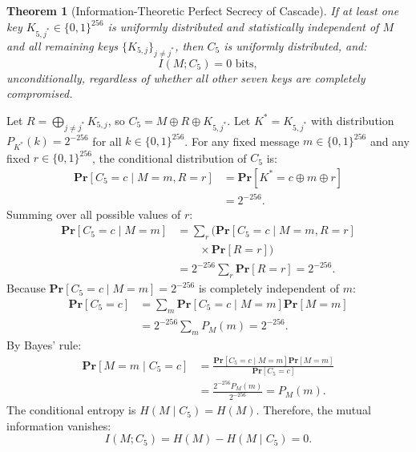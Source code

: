 \documentclass{ieeeaccess}
\renewcommand{\Pr}{\mathbf{Pr}}
\newtheorem{theorem}{Theorem}
\newenvironment{proof}{\begin{IEEEproof}\IEEEQEDoff}{\end{IEEEproof}}
\begin{document}
\begin{theorem}[Information-Theoretic Perfect Secrecy of Cascade]
\label{thm:L5-perfect}
If at least one key $K_{5,j^*} \in \{0,1\}^{256}$ is uniformly distributed and statistically independent of $M$ and all remaining keys $\{K_{5,j}\}_{j \neq j^*}$, then $C_5$ is uniformly distributed, and:
\begin{equation}
  I(M; C_5) = 0 \text{ bits},
\end{equation}
unconditionally, regardless of whether all other seven keys are completely compromised.
\end{theorem}
\begin{proof}
Let $R = \bigoplus_{j \neq j^*} K_{5,j}$, so $C_5 = M \oplus R \oplus K_{5,j^*}$.
Let $K^* = K_{5,j^*}$ with distribution $P_{K^*}(k) = 2^{-256}$ for all $k \in \{0,1\}^{256}$.
For any fixed message $m \in \{0,1\}^{256}$ and any fixed $r \in \{0,1\}^{256}$, the conditional distribution of $C_5$ is:
\begin{equation}
\begin{aligned}
  \Pr[C_5 = c \mid M=m, R=r] &= \Pr[K^* = c \oplus m \oplus r] \\
  &= 2^{-256}.
\end{aligned}
\end{equation}
Summing over all possible values of $r$:
\begin{equation}
\begin{aligned}
  \Pr[C_5 = c \mid M=m]
  &= \sum_r \Big( \Pr[C_5=c \mid M=m, R=r] \\
  &\quad\quad \times \Pr[R=r] \Big) \\
  &= 2^{-256} \sum_r \Pr[R=r] = 2^{-256}.
\end{aligned}
\end{equation}
Because $\Pr[C_5 = c \mid M = m] = 2^{-256}$ is completely independent of $m$:
\begin{equation}
\begin{aligned}
  \Pr[C_5 = c] &= \sum_m \Pr[C_5=c \mid M=m]\Pr[M=m] \\
  &= 2^{-256} \sum_m P_M(m) = 2^{-256}.
\end{aligned}
\end{equation}
By Bayes' rule:
\begin{equation}
\begin{aligned}
  \Pr[M = m \mid C_5 = c] &= \frac{\Pr[C_5 = c \mid M=m]\Pr[M=m]}{\Pr[C_5 = c]} \\
  &= \frac{2^{-256} P_M(m)}{2^{-256}} = P_M(m).
\end{aligned}
\end{equation}
The conditional entropy is $H(M \mid C_5) = H(M)$.
Therefore, the mutual information vanishes:
\begin{equation}
  I(M; C_5) = H(M) - H(M \mid C_5) = 0.
\end{equation}
\end{proof}
\end{document}

